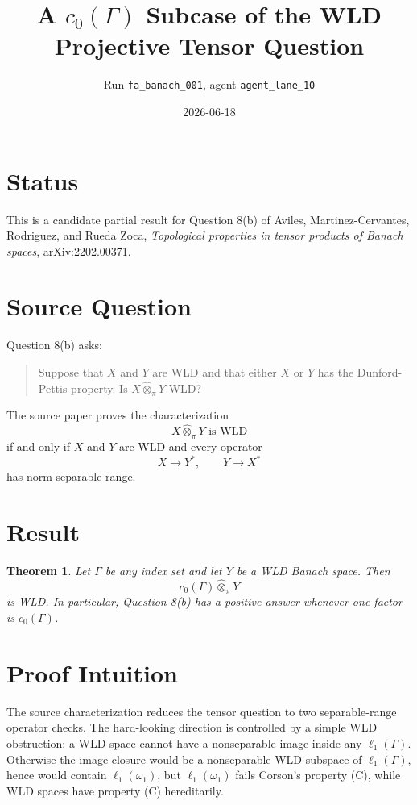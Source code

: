 \documentclass[11pt]{article}
\title{A \(c_0(\Gamma)\) Subcase of the WLD Projective Tensor Question}
\author{Run \texttt{fa\_banach\_001}, agent \texttt{agent\_lane\_10}}
\date{2026-06-18}
\newtheorem{theorem}{Theorem}
\newcommand{\otpi}{\widehat{\otimes}_{\pi}}
\begin{document}
\maketitle

\section*{Status}

This is a candidate partial result for Question 8(b) of Aviles,
Martinez-Cervantes, Rodriguez, and Rueda Zoca, \emph{Topological properties in
tensor products of Banach spaces}, arXiv:2202.00371.

\section*{Source Question}

Question 8(b) asks:

\begin{quote}
Suppose that \(X\) and \(Y\) are WLD and that either \(X\) or \(Y\) has the
Dunford-Pettis property. Is \(X\widehat{\otimes}_{\pi}Y\) WLD?
\end{quote}

The source paper proves the characterization
\[
X\otpi Y\text{ is WLD}
\]
if and only if \(X\) and \(Y\) are WLD and every operator
\[
X\to Y^*, \qquad Y\to X^*
\]
has norm-separable range.

\section*{Result}

\begin{theorem}
Let \(\Gamma\) be any index set and let \(Y\) be a WLD Banach space. Then
\[
c_0(\Gamma)\otpi Y
\]
is WLD. In particular, Question 8(b) has a positive answer whenever one factor
is \(c_0(\Gamma)\).
\end{theorem}

\section*{Proof Intuition}

The source characterization reduces the tensor question to two separable-range
operator checks. The hard-looking direction is controlled by a simple WLD
obstruction: a WLD space cannot have a nonseparable image inside any
\(\ell_1(\Gamma)\). Otherwise the image closure would be a nonseparable WLD
subspace of \(\ell_1(\Gamma)\), hence would contain \(\ell_1(\omega_1)\), but
\(\ell_1(\omega_1)\) fails Corson's property (C), while WLD spaces have
property (C) hereditarily.
\end{document}
